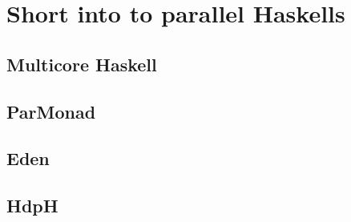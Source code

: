 \section{Short into to parallel Haskells}

\subsection{Multicore Haskell}

\subsection{ParMonad}

\subsection{Eden}

\subsection{HdpH}